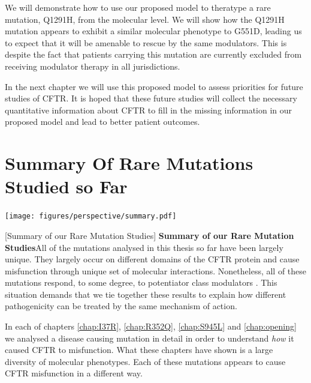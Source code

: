 We will demonstrate how to use our proposed model to theratype a rare mutation, Q1291H, from the molecular level. We will show how the Q1291H mutation appears to exhibit a similar molecular phenotype to G551D, leading us to expect that it will be amenable to rescue by the same modulators. This is despite the fact that patients carrying this mutation are currently excluded from receiving modulator therapy in all jurisdictions. 

In the next chapter we will use this proposed model to assess priorities for future studies of CFTR. It is hoped that these future studies will collect the necessary quantitative information about CFTR to fill in the missing information in our proposed model and lead to better patient outcomes. 



\section{Summary Of Rare Mutations Studied so Far}

	\begin{center}
	  \texttt{[image: figures/perspective/summary.pdf]}
	\end{center}
\begingroup
\captionsetup{singlelinecheck = false, justification=raggedright}
[Summary of our Rare Mutation Studies] {\textbf{Summary of our Rare Mutation Studies}}{All of the mutations analysed in this thesis so far have been largely unique. They largely occur on different domains of the CFTR protein and cause misfunction through unique set of molecular interactions. Nonetheless, all of these mutations respond, to some degree, to potentiator class modulators \cite{wong2022, wong2022a, kim2018, vanwilligen2019}. This situation demands that we tie together these results to explain how different pathogenicity can be treated by the same mechanism of action. } 
\endgroup

In each of chapters \ref{chap:I37R}, \ref{chap:R352Q}, \ref{chap:S945L} and \ref{chap:opening} we analysed a disease causing mutation in detail in order to understand \textit{how} it caused CFTR to misfunction. What these chapters have shown is a large diversity of molecular phenotypes. Each of these mutations appears to cause CFTR misfunction in a different way. 

